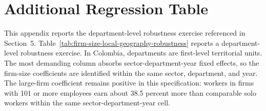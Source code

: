 \section{Additional Regression Table}
\label{app:additional-regression-table}

This appendix reports the department-level robustness exercise referenced in Section~5. Table~\ref{tab:firm-size-local-geography-robustness} reports a department-level robustness exercise. In Colombia, departments are first-level territorial units. The most demanding column absorbs sector-department-year fixed effects, so the firm-size coefficients are identified within the same sector, department, and year. The large-firm coefficient remains positive in this specification: workers in firms with 101 or more employees earn about 38.5 percent more than comparable solo workers within the same sector-department-year cell.


